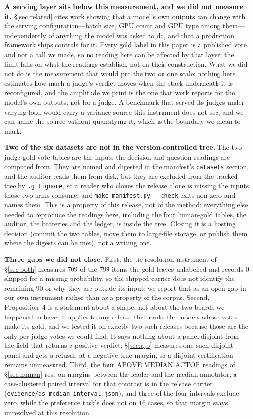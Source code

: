 \documentclass{article}
\newcommand{\ids}[1]{\texttt{\small #1}} %
\begin{document}
\textbf{A serving layer sits below this measurement, and we did not measure it.} \S\ref{sec:related} cites work showing that a model's own outputs can change with the serving configuration---batch size, GPU count and GPU type among them---independently of anything the model was asked to do, and that a production framework ships controls for it. Every gold label in this paper is a published vote and not a call we made, so no reading here can be affected by that layer; the limit falls on what the readings establish, not on their construction. What we did not do is the measurement that would put the two on one scale: nothing here estimates how much a judge's verdict moves when the stack underneath it is reconfigured, and the amplitude we print is the one that work reports for the model's own outputs, not for a judge. A benchmark that served its judges under varying load would carry a variance source this instrument does not see, and we can name the source without quantifying it, which is the boundary we mean to mark.

\textbf{Two of the six datasets are not in the version-controlled tree.} The two judge-gold vote tables are the inputs the decision and question readings are computed from. They are named and digested in the manifest's \texttt{datasets} section, and the auditor reads them from disk, but they are excluded from the tracked tree by \ids{.gitignore}, so a reader who clones the release alone is missing the inputs those two arms consume, and \ids{make\_manifest.py -{}-check} exits non-zero and names them. This is a property of this release, not of the method: everything else needed to reproduce the readings here, including the four human-gold tables, the auditor, the batteries and the ledger, is inside the tree. Closing it is a hosting decision (commit the two tables, move them to large-file storage, or publish them where the digests can be met), not a writing one.

\textbf{Three gaps we did not close.} First, the tie-resolution instrument of \S\ref{sec:both} measures $709$ of the $799$ items the gold leaves unlabelled and records $0$ skipped for a missing probability, so the shipped carrier does not identify the remaining $90$ or why they are outside its input; we report that as an open gap in our own instrument rather than as a property of the corpus. Second, Proposition~4 is a statement about a shape, not about the two boards we happened to have: it applies to any release that ranks the models whose votes make its gold, and we tested it on exactly two such releases because those are the only per-judge votes we could find. It says nothing about a panel disjoint from the field that returns a positive verdict; \S\ref{sec:ajb} measures one such disjoint panel and gets a refusal, at a negative true margin, so a disjoint certification remains unmeasured. Third, the four $\mathrm{ABOVE\_MEDIAN\_ACTOR}$ readings of \S\ref{sec:human} rest on margins between the leader and the median annotator; a case-clustered paired interval for that contrast is in the release carrier (\ids{evidence/ds\_median\_interval.json}), and three of the four intervals exclude zero, while the preference task's does not on $16$ cases, so that margin stays unresolved at this resolution.
\end{document}
